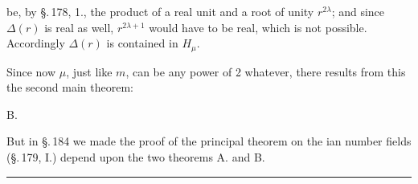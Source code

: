 be, by \S.\,178, 1., the product of a real unit and a root of
unity $r^{2\lambda}$; and since $\Delta(r)$ is real as well,
$r^{2\lambda+1}$ would have to be real, which is not
possible. Accordingly $\Delta(r)$ is contained in $H_\mu$.

Since now $\mu$, just like $m$, can be any power of 2 whatever,
there results from this the second main theorem:

B. 

But in \S.\,184 we made the proof of the principal theorem on
the ian number fields (\S.\,179, I.) depend upon the two
theorems A. and B.

\begin{center}
\rule{4cm}{0.4pt}
\end{center}
